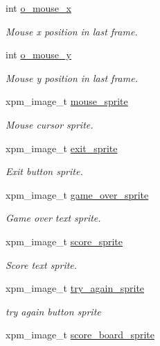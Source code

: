 \begin{DoxyCompactItemize}
int \hyperlink{group__Game-Over-Menu_gad7f272c01893c7161961744eb23516d0}{o\+\_\+mouse\+\_\+x}
\begin{DoxyCompactList}\small\item\em Mouse x position in last frame. \end{DoxyCompactList}\item 
int \hyperlink{group__Game-Over-Menu_ga7c7344b212ca479c18185090a37e0d29}{o\+\_\+mouse\+\_\+y}
\begin{DoxyCompactList}\small\item\em Mouse y position in last frame. \end{DoxyCompactList}\item 
xpm\+\_\+image\+\_\+t \hyperlink{group__Game-Over-Menu_ga1713b7f6ecba05ea9e8281f216eb8818}{mouse\+\_\+sprite}
\begin{DoxyCompactList}\small\item\em Mouse cursor sprite. \end{DoxyCompactList}\item 
xpm\+\_\+image\+\_\+t \hyperlink{group__Game-Over-Menu_ga151ed16274d40549e8aa6715aa4c715a}{exit\+\_\+sprite}
\begin{DoxyCompactList}\small\item\em Exit button sprite. \end{DoxyCompactList}\item 
xpm\+\_\+image\+\_\+t \hyperlink{group__Game-Over-Menu_ga75a1070484069c0a4b134cb82e89285f}{game\+\_\+over\+\_\+sprite}
\begin{DoxyCompactList}\small\item\em Game over text sprite. \end{DoxyCompactList}\item 
xpm\+\_\+image\+\_\+t \hyperlink{group__Game-Over-Menu_ga9c8097218050947104e9eff7ea72ee2a}{score\+\_\+sprite}
\begin{DoxyCompactList}\small\item\em Score text sprite. \end{DoxyCompactList}\item 
xpm\+\_\+image\+\_\+t \hyperlink{group__Game-Over-Menu_gaa41380dca9e42a7214c4383a057eb1b5}{try\+\_\+again\+\_\+sprite}
\begin{DoxyCompactList}\small\item\em try again button sprite \end{DoxyCompactList}\item 
xpm\+\_\+image\+\_\+t \hyperlink{group__Game-Over-Menu_ga4e9f74a7ebd652ff9289c657ccbcbad2}{score\+\_\+board\+\_\+sprite}

\end{DoxyCompactItemize}
